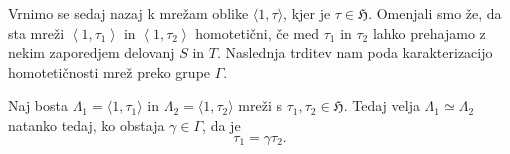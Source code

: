 \documentclass[mat1]{fmfdelo}
\numberwithin{equation}{section}
\newcommand{\HH}{\mathfrak{H}}
\newcommand{\SL}{\Gamma}
\newcommand{\htp}{\simeq}
\newcommand{\lattice}[2]{\left\langle #1, #2 \right\rangle}
\theoremstyle{definition}
\begin{document}
Vrnimo se sedaj nazaj k mrežam oblike $\langle 1, \tau \rangle$, kjer je $\tau \in \HH$. Omenjali smo že, da sta mreži $\lattice{1}{\tau_1}$ in $\lattice{1}{\tau_2}$ homotetični, če med $\tau_1$ in $\tau_2$ lahko prehajamo z nekim zaporedjem delovanj $S$ in $T$. Naslednja trditev nam poda karakterizacijo homotetičnosti mrež preko grupe $\SL$.




\begin{trditev}
    \label{ekvivalentne normalizirane mreze}
    Naj bosta $\Lambda_1 = \langle 1, \tau_1 \rangle$ in $\Lambda_2 = \langle 1, \tau_2 \rangle$ mreži s $\tau_1, \tau_2 \in \HH$. Tedaj velja $\Lambda_1 \htp \Lambda_2$ natanko tedaj, ko obstaja $\gamma \in \SL$,  da je 
    \[
        \tau_1 = \gamma\tau_2.
    \]
\end{trditev}
\end{document}

